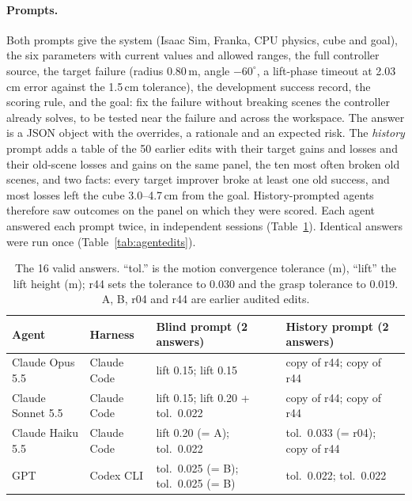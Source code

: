 \documentclass[letterpaper]{article} %
\begin{document}
\paragraph{Prompts.} Both prompts give the system (Isaac Sim, Franka, CPU physics, cube and goal), the six parameters with current values and allowed ranges, the full controller source, the target failure (radius 0.80\,m, angle $-60^\circ$, a lift-phase timeout at 2.03\,cm error against the 1.5\,cm tolerance), the development success record, the scoring rule, and the goal: fix the failure without breaking scenes the controller already solves, to be tested near the failure and across the workspace. The answer is a JSON object with the overrides, a rationale and an expected risk. The \emph{history} prompt adds a table of the 50 earlier edits with their target gains and losses and their old-scene losses and gains on the same panel, the ten most often broken old scenes, and two facts: every target improver broke at least one old success, and most losses left the cube 3.0--4.7\,cm from the goal. History-prompted agents therefore saw outcomes on the panel on which they were scored. Each agent answered each prompt twice, in independent sessions (Table~\ref{tab:agents}). Identical answers were run once (Table~\ref{tab:agentedits}).

\begin{table}[t]
\centering
\small
\begin{tabular}{llll}
\toprule
Agent & Harness & Blind prompt (2 answers) & History prompt (2 answers) \\
\midrule
Claude Opus 5.5 & Claude Code & lift 0.15; lift 0.15 & copy of r44; copy of r44 \\
Claude Sonnet 5.5 & Claude Code & lift 0.15; lift 0.20 + tol.\ 0.022 & copy of r44; copy of r44 \\
Claude Haiku 5.5 & Claude Code & lift 0.20 (= A); tol.\ 0.022 & tol.\ 0.033 (= r04); copy of r44 \\
GPT & Codex CLI & tol.\ 0.025 (= B); tol.\ 0.025 (= B) & tol.\ 0.022; tol.\ 0.022 \\
\bottomrule
\end{tabular}
\caption{The 16 valid answers. ``tol.'' is the motion convergence tolerance (m), ``lift'' the lift height (m); r44 sets the tolerance to 0.030 and the grasp tolerance to 0.019. A, B, r04 and r44 are earlier audited edits.}
\label{tab:agents}
\end{table}
\end{document}
